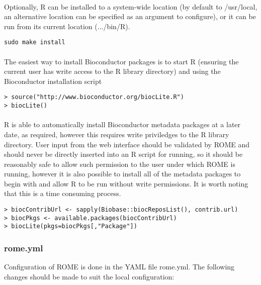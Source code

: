 \paragraph{}
Optionally, R can be installed to a system-wide location (by default to /usr/local, an alternative location can be specified as an argument to configure), or it can be run from its current location (.../bin/R).

\begin{verbatim}
sudo make install
\end{verbatim}


\paragraph{}
The easiest way to install Bioconductor packages is to start R (ensuring the current user has write access to the R library directory) and using the Bioconductor installation script
\begin{verbatim}
> source("http://www.bioconductor.org/biocLite.R")
> biocLite()
\end{verbatim}

\paragraph{}
R is able to automatically install Bioconductor metadata packages at a later date, as required, however this requires  write priviledges to the R library directory. User input from the web interface should be validated by ROME and should never be directly inserted into an R script for running, so it should be reasonably safe to allow such permission to the user under which ROME is running, however it is also possible to install all of the metadata packages to begin with and allow R to be run without write permissions. It is worth noting that this is a time consuming process.

\begin{verbatim}
> biocContribUrl <- sapply(Biobase::biocReposList(), contrib.url)
> biocPkgs <- available.packages(biocContribUrl)
> biocLite(pkgs=biocPkgs[,"Package"])
\end{verbatim}


\subsubsection{rome.yml}
Configuration of ROME is done in the YAML file rome.yml. The following changes should be made to suit the local configuration:


